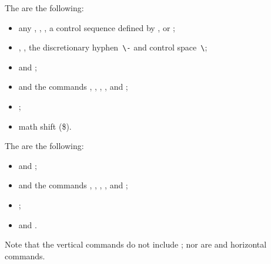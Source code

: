 \documentclass{book}
\begin{document}
The  are the following:
\label{h:com:list}
\begin{itemize}
\item any , , , 
a control sequence defined by , or ;
\item {}, , the discretionary
hyphen~\verb|\-| and control space~\verb|\|;
\item {} and ;
\item {} and the
 commands
, , , , and ;
\item {};
\item math shift (\n\$).
\end{itemize}

The  are the following:
\label{v:com:list}
\begin{itemize}
\item {} and ;
\item {} and the  commands
 , , , , and ;
\item {};
\item {} and .
\end{itemize}
Note that the vertical commands do not include ;
nor are  and  horizontal commands.
\end{document}
